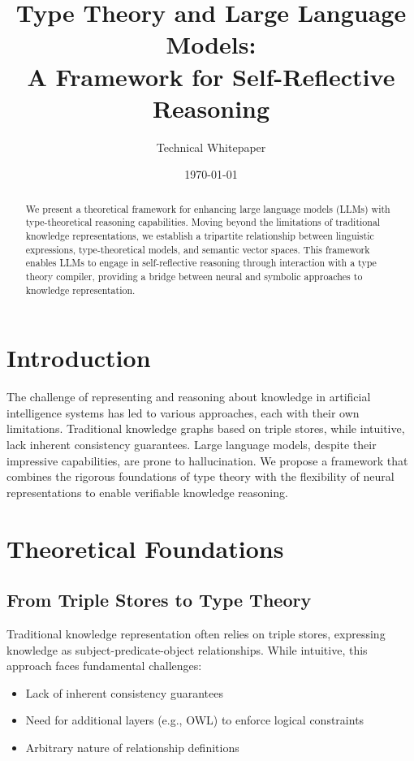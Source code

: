 \documentclass[11pt]{article}
\title{Type Theory and Large Language Models: \\
A Framework for Self-Reflective Reasoning}
\author{Technical Whitepaper}
\date{\today}
\begin{document}
\maketitle

\begin{abstract}
We present a theoretical framework for enhancing large language models (LLMs) with type-theoretical reasoning capabilities. Moving beyond the limitations of traditional knowledge representations, we establish a tripartite relationship between linguistic expressions, type-theoretical models, and semantic vector spaces. This framework enables LLMs to engage in self-reflective reasoning through interaction with a type theory compiler, providing a bridge between neural and symbolic approaches to knowledge representation.
\end{abstract}

\section{Introduction}
The challenge of representing and reasoning about knowledge in artificial intelligence systems has led to various approaches, each with their own limitations. Traditional knowledge graphs based on triple stores, while intuitive, lack inherent consistency guarantees. Large language models, despite their impressive capabilities, are prone to hallucination. We propose a framework that combines the rigorous foundations of type theory with the flexibility of neural representations to enable verifiable knowledge reasoning.

\section{Theoretical Foundations}

\subsection{From Triple Stores to Type Theory}
Traditional knowledge representation often relies on triple stores, expressing knowledge as subject-predicate-object relationships. While intuitive, this approach faces fundamental challenges:

\begin{itemize}
    \item Lack of inherent consistency guarantees
    \item Need for additional layers (e.g., OWL) to enforce logical constraints
    \item Arbitrary nature of relationship definitions
\end{itemize}
\end{document}
